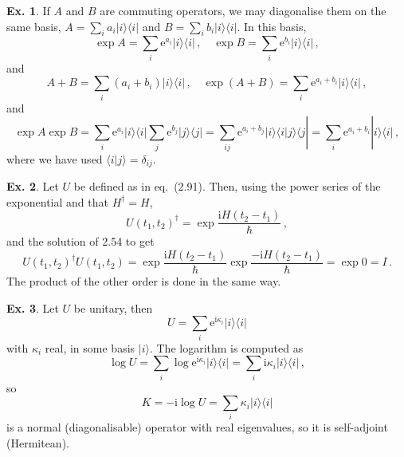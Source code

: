 \documentclass[a4paper,12pt]{article}
\def\e{\mathrm{e}}
\def\imagi{\mathrm{i}}
\theoremstyle{definition}
\newtheorem{exercise}{Ex.}[section]
\begin{document}
\begin{exercise}
 If $A$ and $B$ are commuting operators, we may diagonalise them on the same basis, $A=\sum_i a_i |i\rangle\langle i|$ and $B=\sum_i b_i |i\rangle\langle i|$. In this basis,
 \[
  \exp A = \sum_i \e^{a_i} |i\rangle\langle i|\,,\quad
  \exp B = \sum_i \e^{b_i} |i\rangle\langle i|\,,
 \]
 and
 \[
  A+B = \sum_i(a_i+b_i)|i\rangle\langle i|\,,\quad
  \exp(A+B) = \sum_i \e^{a_i+b_i}|i\rangle\langle i|\,,
 \]
 and
 \[
  \exp A \exp B = \sum_i \e^{a_i}|i\rangle\langle i| \sum_j \e^{b_j}|j\rangle\langle j| = \sum_{ij}\e^{a_i + b_j}|i\rangle\langle i | j \rangle \langle j| = \sum_i \e^{a_i + b_i} |i\rangle\langle i|\,,
 \]
 where we have used $\langle i | j\rangle = \delta_{ij}$.
\end{exercise}

\begin{exercise}
 Let $U$ be defined as in eq.\ (2.91). Then, using the power series of the exponential and that $H^\dagger = H$,
 \[
  U(t_1, t_2)^\dagger = \exp \frac{\imagi H(t_2-t_1)}{\hbar}\,,
 \]
 and the solution of 2.54 to get
 \[
  U(t_1, t_2)^\dagger U(t_1, t_2) = \exp \frac{\imagi H(t_2-t_1)}{\hbar} \exp \frac{-\imagi H(t_2-t_1)}{\hbar} = \exp 0 = I\,.
 \]
 The product of the other order is done in the same way.
\end{exercise}

\begin{exercise}
 Let $U$ be unitary, then
 \[
  U = \sum_i \e^{\imagi\kappa_i} |i\rangle\langle i|
 \]
 with $\kappa_i$ real, in some basis $|i\rangle$. The logarithm is computed as
 \[
  \log U = \sum_i \log\e^{\imagi \kappa_i} |i\rangle\langle i| =
  \sum_i \imagi \kappa_i |i\rangle\langle i|\,,
 \]
 so
 \[
  K = -\imagi \log U = \sum_i \kappa_i |i\rangle\langle i|
 \]
 is a normal (diagonalisable) operator with real eigenvalues, so it is self-adjoint (Hermitean).
\end{exercise}
\end{document}
